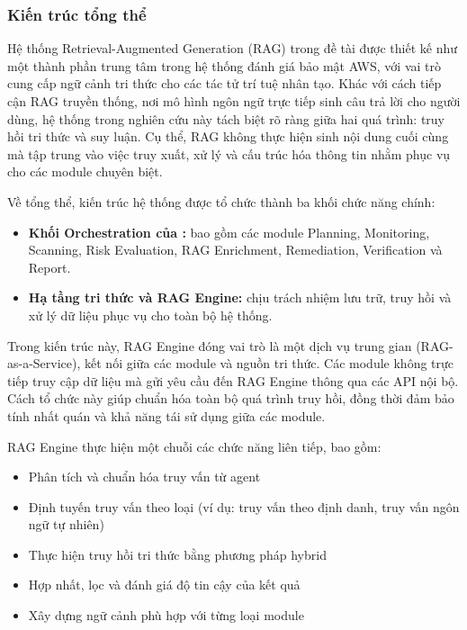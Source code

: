 \subsubsection*{Kiến trúc tổng thể}

Hệ thống Retrieval-Augmented Generation (RAG) trong đề tài được thiết kế như một thành phần trung tâm trong hệ thống đánh giá bảo mật AWS, với vai trò cung cấp ngữ cảnh tri thức cho các tác tử trí tuệ nhân tạo. Khác với cách tiếp cận RAG truyền thống, nơi mô hình ngôn ngữ trực tiếp sinh câu trả lời cho người dùng, hệ thống trong nghiên cứu này tách biệt rõ ràng giữa hai quá trình: truy hồi tri thức và suy luận. Cụ thể, RAG không thực hiện sinh nội dung cuối cùng mà tập trung vào việc truy xuất, xử lý và cấu trúc hóa thông tin nhằm phục vụ cho các module chuyên biệt.

Về tổng thể, kiến trúc hệ thống được tổ chức thành ba khối chức năng chính:

\begin{itemize}
    \item \textbf{Khối Orchestration của \sysnameshort{}:} bao gồm các module Planning, Monitoring, Scanning, Risk Evaluation, RAG Enrichment, Remediation, Verification và Report.
    \item \textbf{Hạ tầng tri thức và RAG Engine:} chịu trách nhiệm lưu trữ, truy hồi và xử lý dữ liệu phục vụ cho toàn bộ hệ thống.
\end{itemize}

Trong kiến trúc này, RAG Engine đóng vai trò là một dịch vụ trung gian (RAG-as-a-Service), kết nối giữa các module và nguồn tri thức. Các module không trực tiếp truy cập dữ liệu mà gửi yêu cầu đến RAG Engine thông qua các API nội bộ. Cách tổ chức này giúp chuẩn hóa toàn bộ quá trình truy hồi, đồng thời đảm bảo tính nhất quán và khả năng tái sử dụng giữa các module.

RAG Engine thực hiện một chuỗi các chức năng liên tiếp, bao gồm:

\begin{itemize}
    \item Phân tích và chuẩn hóa truy vấn từ agent
    \item Định tuyến truy vấn theo loại (ví dụ: truy vấn theo định danh, truy vấn ngôn ngữ tự nhiên)
    \item Thực hiện truy hồi tri thức bằng phương pháp hybrid
    \item Hợp nhất, lọc và đánh giá độ tin cậy của kết quả
    \item Xây dựng ngữ cảnh phù hợp với từng loại module
\end{itemize}


